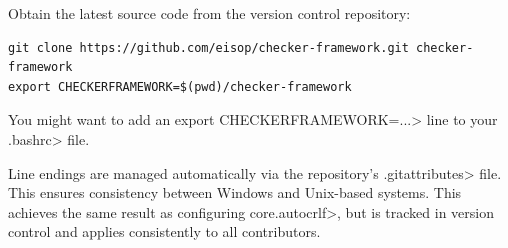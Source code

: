 
Obtain the latest source code from the version control repository:

\begin{Verbatim}
git clone https://github.com/eisop/checker-framework.git checker-framework
export CHECKERFRAMEWORK=$(pwd)/checker-framework
\end{Verbatim}

You might want to add an \<export CHECKERFRAMEWORK=...> line to your
\<.bashrc> file.

Line endings are managed automatically via the repository’s \<.gitattributes> file.
This ensures consistency between Windows and Unix-based systems.
This achieves the same result as configuring \<core.autocrlf>, but is tracked in version control and applies consistently to all contributors.



